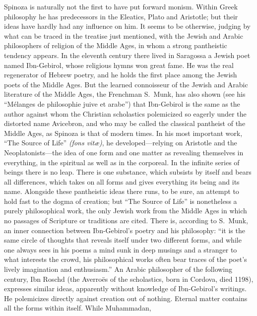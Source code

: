 \documentclass[12pt]{book}
\newcommand{\opage}[1]{\marginnote{\footnotesize\textit{[#1]}}}
\begin{document}
Spinoza is naturally not the first to have put forward monism. Within Greek
philosophy he has predecessors in the Eleatics, Plato and Aristotle; but their ideas
have hardly had any influence on him. It seems to be otherwise, judging by what can
be traced in the treatise just mentioned, with the Jewish and Arabic philosophers
of religion of the Middle Ages, %
in whom a strong pantheistic tendency appears. In the eleventh century there lived
in Saragossa a Jewish poet named Ibn-Gebirol, whose religious hymns won great fame.
He was the real regenerator \opage{9}of Hebrew poetry, and he holds the first place
among the Jewish poets of the Middle Ages. But the learned connoisseur of the Jewish
and Arabic literature of the Middle Ages, the Frenchman S.~Munk, has also shown
(see his ``Mélanges de philosophie juive et arabe'') that Ibn-Gebirol is the same as
the author against whom the Christian scholastics polemicized so eagerly under the
distorted name Avicebron, and who may be called the classical pantheist of the
Middle Ages, as Spinoza is that of modern times. In his most important work, ``The
Source of Life'' \textit{(fons vitæ)}, he developed---relying on Aristotle and the
Neoplatonists---the idea of one form and one matter as revealing themselves in
everything, in the spiritual as well as in the corporeal. In the infinite series of
beings there is no leap. There is one substance, which subsists by itself and bears
all differences, which takes on all forms and gives everything its being and its
name. Alongside these pantheistic ideas there runs, to be sure, an attempt to hold
fast to the dogma of creation; but ``The Source of Life'' is nonetheless a purely
philosophical work, the only Jewish work from the Middle Ages in which no passages
of Scripture or traditions are cited. There is, according to S.~Munk, an inner
connection between Ibn-Gebirol's poetry and his philosophy: ``it is the same circle
of thoughts that reveals itself under two different forms, and while one always sees
in his poems a mind sunk in deep musings and a stranger to what interests the
crowd, his philosophical works often bear traces of the poet's lively imagination
and enthusiasm.'' An Arabic philosopher of the following century, Ibn Roschd (the
Averroës of the scholastics, %
born in Cordova, died \opage{10}1198), expresses similar ideas, apparently without
knowledge of Ibn-Gebirol's writings. He polemicizes directly against creation out of
nothing. Eternal matter contains all the forms within itself. While Muhammadan,
\end{document}
